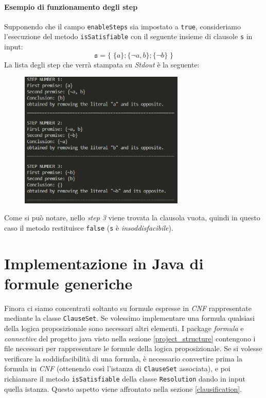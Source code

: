 \documentclass[a4paper,12pt]{report}
\begin{document}
\subsubsection{Esempio di funzionamento degli step}
Supponendo che il campo \texttt{enableSteps} sia impostato a \texttt{true}, consideriamo l'esecuzione del metodo \texttt{isSatisfiable} con il seguente insieme di clausole \texttt{s} in input:
\[\texttt{s} = \{\; \{a\}; \{\lnot a, b\}; \{\lnot b\} \;\}\]
La lista degli step che verrà stampata su \emph{Stdout} è la seguente:
\begin{figure}[H]
    \centering
    \includegraphics[width=0.7\textwidth, height=0.4\textheight]{img/step.png}
\end{figure} 
Come si può notare, nello \emph{step 3} viene trovata la clausola vuota, quindi in questo caso il metodo restituisce \texttt{false} (\texttt{s} è \emph{insoddisfacibile}).


% 
% 
\chapter{Implementazione in Java di formule generiche}
\label{formulas}
Finora ci siamo concentrati soltanto su formule espresse in \emph{CNF} rappresentate mediante la classe \texttt{ClauseSet}. Se volessimo implementare una formula qualsiasi della logica proposizionale sono necessari altri elementi. I package \emph{formula} e \emph{connective} del progetto java visto nella sezione \ref{project_structure} contengono i file necessari per rappresentare le formule della logica proposizionale. Se si volesse verificare la soddisfacibilità di una formula, è necessario convertire prima la formula in \emph{CNF} (ottenendo così l'istanza di \texttt{ClauseSet} associata), e poi richiamare il metodo \texttt{isSatisfiable} della classe \texttt{Resolution} dando in input quella istanza. Questo aspetto viene affrontato nella sezione \ref{clausification}.
\end{document}
